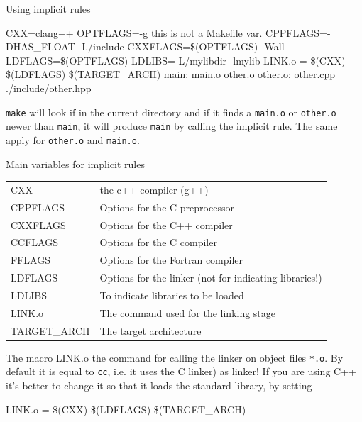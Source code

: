 \documentclass[10pt,aspectratio=169]{beamer}
\newcommand{\blue}{\color{blue}}
\begin{document}
\begin{frame}{Using implicit rules}
\begin{semiverbatim}
CXX=clang++\newline
OPTFLAGS=-g \alert{this is not a Makefile var.}\newline
CPPFLAGS=-DHAS\_FLOAT -I./include\newline
CXXFLAGS=\$(OPTFLAGS) -Wall\newline
LDFLAGS=\$(OPTFLAGS)\newline
LDLIBS=-L/mylibdir -lmylib\newline
LINK.o = \$(CXX) \$(LDFLAGS) \$(TARGET\_ARCH)\newline
main: main.o other.o\newline
other.o: other.cpp ./include/other.hpp
\end{semiverbatim}
\smallskip

\texttt{make} will look if in the current directory and if it finds
a \texttt{main.o} or \texttt{other.o} newer than \texttt{main}, it will produce \texttt{main} by calling the implicit rule.
The same apply for \texttt{other.o} and \texttt{main.o}.
\end{frame}



\begin{frame}{Main variables for implicit rules}
\begin{tabular}{>{\ttfamily}l|l} CXX & the c++ compiler (g++)\\
  CPPFLAGS & Options for the C preprocessor\\
  CXXFLAGS & Options for the
             C++ compiler\\
  CCFLAGS & Options for the C compiler\\
  FFLAGS & Options for the Fortran compiler\\
  LDFLAGS & Options for the linker \alert{(not for indicating libraries!)}\\   LDLIBS & To indicate libraries to be loaded\\
  LINK.o & The command used for the linking stage\\
  TARGET\_ARCH & The target architecture\\
\end{tabular}
\medskip

The macro \alert{LINK.o} the command for calling the {\blue linker}
on object files \texttt{*.o}. By default it is equal to \texttt{cc}, i.e. it uses the C linker) as linker! If you are using C++ it's better to change it so that it loads the standard library, by setting
\begin{semiverbatim}
    LINK.o = \$(CXX) \$(LDFLAGS) \$(TARGET\_ARCH)
\end{semiverbatim}

\smallskip
\end{frame}
\end{document}
